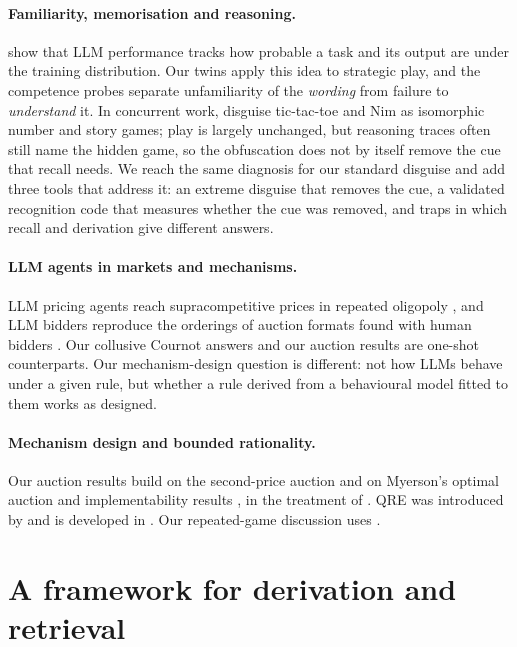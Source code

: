 \documentclass[11pt]{article}
\theoremstyle{definition}
\theoremstyle{remark}
\begin{document}
\paragraph{Familiarity, memorisation and reasoning.} \citet{mccoy2024embers} show that LLM
performance tracks how probable a task and its output are under the training distribution. Our
twins apply this idea to strategic play, and the competence probes separate unfamiliarity of the
\emph{wording} from failure to \emph{understand} it. In concurrent work, \citet{rada2026experience}
disguise tic-tac-toe and Nim as isomorphic number and story games; play is largely unchanged,
but reasoning traces often still name the hidden game, so the obfuscation does not by itself
remove the cue that recall needs. We reach the same diagnosis for our standard disguise and
add three tools that address it: an extreme disguise that removes the cue, a validated
recognition code that measures whether the cue was removed, and traps in which recall and
derivation give different answers.

\paragraph{LLM agents in markets and mechanisms.} LLM pricing agents reach supracompetitive
prices in repeated oligopoly \citep{fish2024collusion}, and LLM bidders reproduce the
orderings of auction formats found with human bidders \citep{shah2025bidders}. Our collusive
Cournot answers and our auction results are one-shot counterparts. Our mechanism-design question
is different: not how LLMs behave under a given rule, but whether a rule derived from a
behavioural model fitted to them works as designed.

\paragraph{Mechanism design and bounded rationality.} Our auction results build on the
second-price auction \citep{vickrey1961} and on Myerson's optimal auction and implementability
results \citep{myerson1981}, in the treatment of \citet{roughgarden2016}. QRE was introduced by
\citet{mckelvey1995qre} and is developed in \citet{goeree2016qre}. Our repeated-game discussion
uses \citet{benoit1985finitely}.

\section{A framework for derivation and retrieval}\label{sec:framework}
\end{document}
